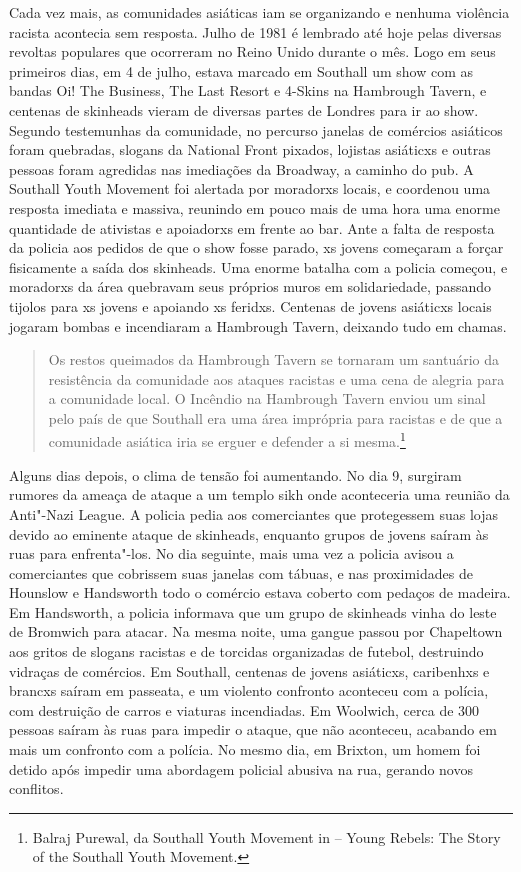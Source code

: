 Cada vez mais, as comunidades asiáticas iam se organizando e nenhuma violência racista acontecia sem resposta. Julho de 1981 é lembrado até hoje pelas diversas revoltas populares que ocorreram no Reino Unido durante o mês. Logo em seus primeiros dias, em 4 de julho, estava marcado em Southall um show com as bandas Oi! The Business, The Last Resort e 4-Skins na Hambrough Tavern, e centenas de skinheads vieram de diversas partes de Londres para ir ao show. Segundo testemunhas da comunidade, no percurso janelas de comércios asiáticos foram quebradas, slogans da National Front pixados, lojistas asiáticxs e outras pessoas foram agredidas nas imediações da Broadway, a caminho do pub. A Southall Youth Movement foi alertada por moradorxs locais, e coordenou uma resposta imediata e massiva, reunindo em pouco mais de uma hora uma enorme quantidade de ativistas e apoiadorxs em frente ao bar. Ante a falta de resposta da policia aos pedidos de que o show fosse parado, xs jovens começaram a forçar fisicamente a saída dos skinheads. Uma enorme batalha com a policia começou, e moradorxs da área quebravam seus próprios muros em solidariedade, passando tijolos para xs jovens e apoiando xs feridxs. Centenas de jovens asiáticxs locais jogaram bombas e incendiaram a Hambrough Tavern, deixando tudo em chamas.

\begin{quote}
Os restos queimados da Hambrough Tavern se tornaram um santuário da resistência da comunidade aos ataques racistas e uma cena de alegria para a comunidade local. O Incêndio na Hambrough Tavern enviou um sinal pelo país de que Southall era uma área imprópria para racistas e de que a comunidade asiática iria se erguer e defender a si mesma.\footnote{Balraj Purewal, da Southall Youth Movement in  -- Young Rebels: The Story of the Southall Youth Movement.}
\end{quote}

Alguns dias depois, o clima de tensão foi aumentando. No dia 9, surgiram rumores da ameaça de ataque a um templo sikh onde aconteceria uma reunião da Anti"-Nazi League. A policia pedia aos comerciantes que protegessem suas lojas devido ao eminente ataque de skinheads, enquanto grupos de jovens saíram às ruas para enfrenta"-los. No dia seguinte, mais uma vez a policia avisou a comerciantes que cobrissem suas janelas com tábuas, e nas proximidades de Hounslow e Handsworth todo o comércio estava coberto com pedaços de madeira. Em Handsworth, a policia informava que um grupo de skinheads vinha do leste de Bromwich para atacar. Na mesma noite, uma gangue passou por Chapeltown aos gritos de slogans racistas e de torcidas organizadas de futebol, destruindo vidraças de comércios. Em Southall, centenas de jovens asiáticxs, caribenhxs e brancxs saíram em passeata, e um violento confronto aconteceu com a polícia, com destruição de carros e viaturas incendiadas. Em Woolwich, cerca de 300 pessoas saíram às ruas para impedir o ataque, que não aconteceu, acabando em mais um confronto com a polícia. No mesmo dia, em Brixton, um homem foi detido após impedir uma abordagem policial abusiva na rua, gerando novos conflitos.

